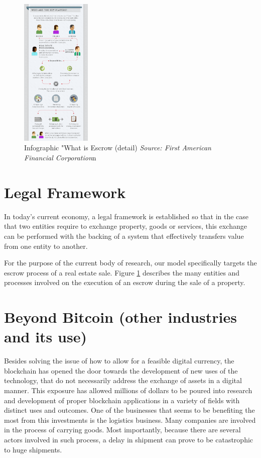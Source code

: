 \documentclass[submission,copyright,creativecommons]{eptcs}
\begin{document}
\begin{figure}
    \centering
    \includegraphics[width=0.30\textwidth]{infog-what-is-escrow_detail.png}
    \caption{Infographic "What is Escrow (detail)\cite{WhatEscrow} \textit{Source: First American Financial Corporation}n}
    \label{fig:info_escrow}
\end{figure}
\section{Legal Framework}
In today's current economy, a legal framework is established so that in the case that two entities require to exchange property, goods or services, this exchange can be performed with the backing of a system that effectively transfers value from one entity to another.

For the purpose of the current body of research, our model specifically targets the escrow process of a real estate sale. Figure \ref{fig:info_escrow} describes the many entities and processes involved on the execution of an escrow during the sale of a property.

\section{Beyond Bitcoin (other industries and its use)}
Besides solving the issue of how to allow for a feasible digital currency, the blockchain has opened the door towards the development of new uses of the technology, that do not necessarily address the exchange of assets in a digital manner.  This exposure has allowed millions of dollars to be poured into research and development of proper blockchain applications in a variety of fields with distinct uses and outcomes.
One of the businesses that seems to be benefiting the most from this investments is the logistics business. Many companies are involved in the process of carrying goods. Most importantly, because there are several actors involved in such process, a delay in shipment can prove to be catastrophic to huge shipments.  
\end{document}
